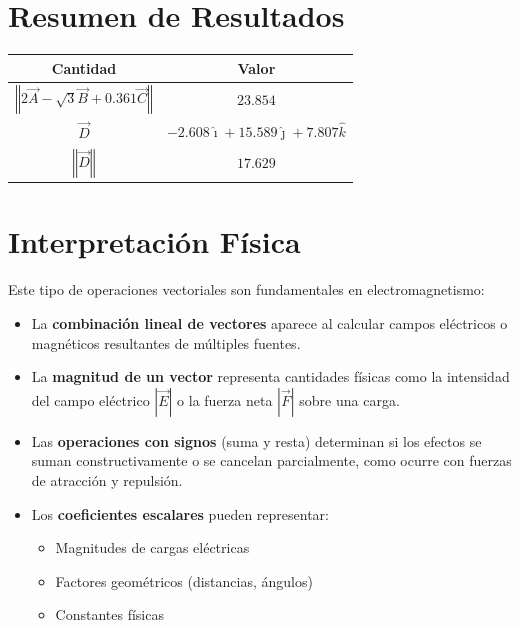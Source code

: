 \documentclass[12pt,letterpaper]{article}
\begin{document}
\section*{Resumen de Resultados}

\begin{center}
\begin{tabular}{|c|c|}
\hline
\textbf{Cantidad} & \textbf{Valor} \\
\hline
\hline
$\left\Vert 2\vec{A}-\sqrt{3}\vec{B}+0.361\vec{C}\right\Vert$ & $\boxed{23.854}$ \\
\hline
$\vec{D}$ & $\boxed{-2.608\hat{\imath}+15.589\hat{\jmath}+7.807\hat{k}}$ \\
\hline
$\left\Vert \vec{D} \right\Vert$ & $\boxed{17.629}$ \\
\hline
\end{tabular}
\end{center}

\section*{Interpretaci\'on F\'isica}

Este tipo de operaciones vectoriales son fundamentales en electromagnetismo:

\begin{itemize}
    \item La \textbf{combinaci\'on lineal de vectores} aparece al calcular campos el\'ectricos o magn\'eticos resultantes de m\'ultiples fuentes.

    \item La \textbf{magnitud de un vector} representa cantidades f\'isicas como la intensidad del campo el\'ectrico $|\vec{E}|$ o la fuerza neta $|\vec{F}|$ sobre una carga.

    \item Las \textbf{operaciones con signos} (suma y resta) determinan si los efectos se suman constructivamente o se cancelan parcialmente, como ocurre con fuerzas de atracci\'on y repulsi\'on.

    \item Los \textbf{coeficientes escalares} pueden representar:
    \begin{itemize}
        \item Magnitudes de cargas el\'ectricas
        \item Factores geom\'etricos (distancias, \'angulos)
        \item Constantes f\'isicas
    \end{itemize}
\end{itemize}
\end{document}
